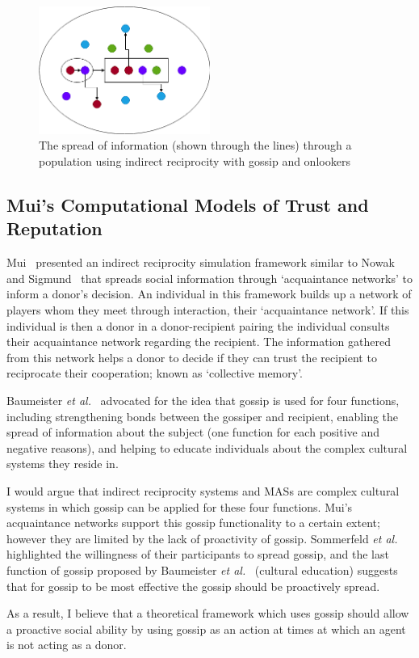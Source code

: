 \documentclass[]{final_report}
\begin{document}
\begin{figure}
	\center
	\includegraphics[width=0.5\textwidth]{Gossip_and_onlookers.png}
	\caption{The spread of information (shown through the lines) through a population using indirect reciprocity with gossip and onlookers}
	\label{fig:gossip_and_onlookers}
\end{figure}

\subsection{Mui's Computational Models of Trust and Reputation}
Mui~\cite{mui2002computational} presented an indirect reciprocity simulation framework similar to Nowak and Sigmund~\cite{evol_indirect_image} that spreads social information through `acquaintance networks' to inform a donor's decision. An individual in this framework builds up a network of players whom they meet through interaction, their `acquaintance network'. If this individual is then a donor in a donor-recipient pairing the individual consults their acquaintance network regarding the recipient. The information gathered from this network helps a donor to decide if they can trust the recipient to reciprocate their cooperation; known as `collective memory'.\par
Baumeister \textit{et al.}~\cite{baumeister2004gossip} advocated for the idea that gossip is used for four functions, including strengthening bonds between the gossiper and recipient, enabling the spread of information about the subject (one function for each positive and negative reasons), and helping to educate individuals about the complex cultural systems they reside in.\par
I would argue that indirect reciprocity systems and MASs are complex cultural systems in which gossip can be applied for these four functions. Mui's acquaintance networks support this gossip functionality to a certain extent; however they are limited by the lack of proactivity of gossip. Sommerfeld \textit{et al.}~\cite{gossip_alt} highlighted the willingness of their participants to spread gossip, and the last function of gossip proposed by Baumeister \textit{et al.}~\cite{baumeister2004gossip} (cultural education) suggests that for gossip to be most effective the gossip should be proactively spread.\par
As a result, I believe that a theoretical framework which uses gossip should allow a proactive social ability  by using gossip as an action at times at which an agent is not acting as a donor. 
\end{document}
